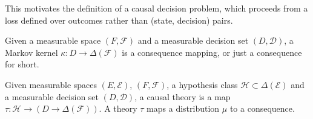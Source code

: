 This motivates the definition of a causal decision problem, which proceeds from a loss defined over outcomes rather than (state, decision) pairs.

\begin{definition}[Consequences]
Given a measurable space $(F,\mathcal{F})$ and a measurable decision set $(D,\mathcal{D})$, a Markov kernel $\kappa:D \to \Delta(\mathcal{F})$ is a consequence mapping, or just a consequence for short.
\end{definition}

\begin{definition}\label{def:causal_theory}
Given measurable spaces $(E,\mathcal{E})$, $(F,\mathcal{F})$, a hypothesis class $\mathscr{H}\subset \Delta(\mathcal{E})$ and a measurable decision set $(D,\mathcal{D})$, a causal theory is a map $\tau:\mathscr{H}\to (D \to \Delta(\mathcal{F}))$. A theory $\tau$ maps a distribution $\mu$ to a consequence.
\end{definition}

